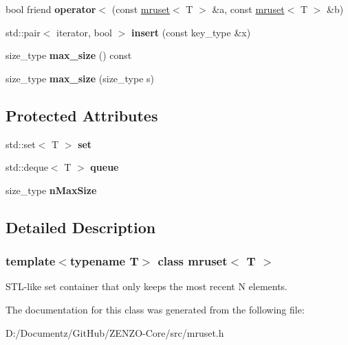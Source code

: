 \begin{DoxyCompactItemize}
\mbox{\label{classmruset_a5a95239f76da8ba675ba748baf1f07c8}} 
bool friend {\bfseries operator$<$} (const \mbox{\hyperlink{classmruset}{mruset}}$<$ T $>$ \&a, const \mbox{\hyperlink{classmruset}{mruset}}$<$ T $>$ \&b)
\item 
\mbox{\label{classmruset_af2e0dfe9d8b029bde78457797cdc42a9}} 
std\+::pair$<$ iterator, bool $>$ {\bfseries insert} (const key\+\_\+type \&x)
\item 
\mbox{\label{classmruset_af33f9531e47639e4dc6a42c123797292}} 
size\+\_\+type {\bfseries max\+\_\+size} () const
\item 
\mbox{\label{classmruset_a030aa4599dfb54074183e2cdfbe2373f}} 
size\+\_\+type {\bfseries max\+\_\+size} (size\+\_\+type s)
\end{DoxyCompactItemize}
\subsection*{Protected Attributes}
\begin{DoxyCompactItemize}
\item 
\mbox{\label{classmruset_a4981fc3556b61600418b2ddad98cc685}} 
std\+::set$<$ T $>$ {\bfseries set}
\item 
\mbox{\label{classmruset_a6be1fe81dc472e25e160911288373663}} 
std\+::deque$<$ T $>$ {\bfseries queue}
\item 
\mbox{\label{classmruset_a6d3d6963e3ca5689e846b12a29dd09ab}} 
size\+\_\+type {\bfseries n\+Max\+Size}
\end{DoxyCompactItemize}


\subsection{Detailed Description}
\subsubsection*{template$<$typename T$>$\newline
class mruset$<$ T $>$}

S\+T\+L-\/like set container that only keeps the most recent N elements. 

The documentation for this class was generated from the following file\+:\begin{DoxyCompactItemize}
\item 
D\+:/\+Documentz/\+Git\+Hub/\+Z\+E\+N\+Z\+O-\/\+Core/src/mruset.\+h\end{DoxyCompactItemize}

